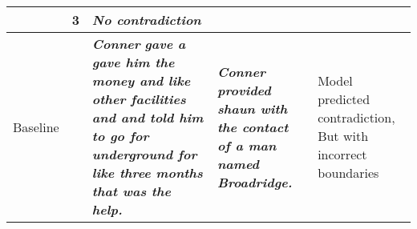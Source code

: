 \begin{table*}[ht]
{\begin{tabular}{lcp{25em}p{25em}p{20em}}
& 3 & \textcolor{red!90}{\emph{\textbf{No contradiction}}} & 
 & \multirow{3}{20em}{} \\ \midrule{}

Baseline & & \textcolor{red!90}{\emph{\textbf{Conner}}} \textcolor{darkgreen!90}{\emph{\textbf{gave a gave him the money and like other facilities}}} \textcolor{red!90}{\emph{\textbf{and and told him to go for underground for like three months that was the help.}}} & \textcolor{red!90}{\emph{\textbf{Conner}}} \textcolor{darkgreen!90}{\emph{\textbf{provided shaun with the contact of a man named Broadridge.}}} & \multirow{3}{20em}{Model predicted contradiction, But with incorrect boundaries} \\ 


                   



\end{tabular}}
\end{table*}
